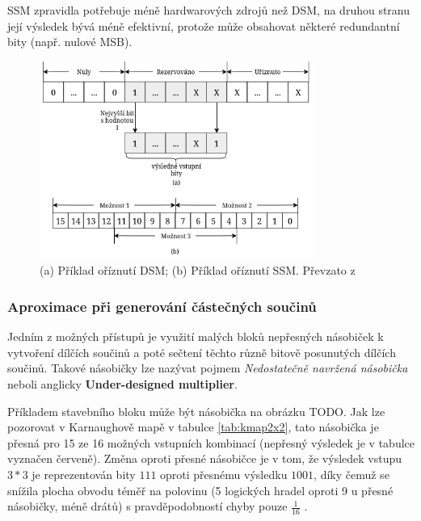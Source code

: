 SSM zpravidla potřebuje méně hardwarových zdrojů než DSM, na druhou stranu její výsledek bývá méně efektivní, protože může obsahovat některé redundantní bity (např. nulové MSB).

\begin{figure}[H]
    \centering
    \includegraphics[width=0.8\textwidth]{obrazky-figures/dsm_ssm.png}
    \caption{(a) Příklad oříznutí DSM; (b) Příklad oříznutí SSM. Převzato z \cite{approx_mult_survey}}
    \label{fig:dsm_ssm}
\end{figure}

\subsubsection{Aproximace při generování částečných součinů}
Jedním z možných přístupů je využití malých bloků nepřesných násobiček k vytvoření dílčích součinů a poté sečtení těchto různě bitově posunutých dílčích součinů. Takové násobičky lze nazývat pojmem \textit{Nedostatečně navržená násobička} neboli anglicky \textbf{Under-designed multiplier}. 

Příkladem stavebního bloku může být násobička na obrázku TODO. Jak lze pozorovat v Karnaughově mapě v tabulce \ref{tab:kmap2x2}, tato násobička je přesná pro 15 ze 16 možných vstupních kombinací (nepřesný výsledek je v tabulce vyznačen červeně). Změna oproti přesné násobičce je v tom, že výsledek vstupu $3*3$ je reprezentován bity $111$ oproti přesnému výsledku $1001$, díky čemuž se snížila plocha obvodu téměř na polovinu (5 logických hradel oproti 9 u přesné násobičky, méně drátů) s pravděpodobností chyby pouze $\frac{1}{16}$ \cite{underdesigned_mult}.

